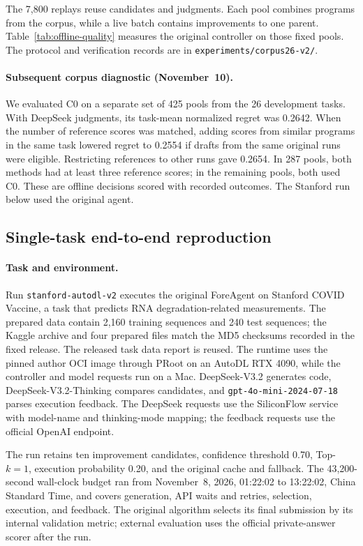 The 7,800 replays reuse candidates and judgments. Each pool combines programs from the corpus, while a live batch contains improvements to one parent. Table~\ref{tab:offline-quality} measures the original controller on those fixed pools. The protocol and verification records are in \texttt{experiments/corpus26-v2/}.

\paragraph{Subsequent corpus diagnostic (November~10).}
We evaluated C0 on a separate set of 425 pools from the 26 development tasks. With DeepSeek judgments, its task-mean normalized regret was 0.2642. When the number of reference scores was matched, adding scores from similar programs in the same task lowered regret to 0.2554 if drafts from the same original runs were eligible. Restricting references to other runs gave 0.2654. In 287 pools, both methods had at least three reference scores; in the remaining pools, both used C0. These are offline decisions scored with recorded outcomes. The Stanford run below used the original agent.

\subsection{Single-task end-to-end reproduction}
\label{sec:online-run}

\paragraph{Task and environment.}
Run \texttt{stanford-autodl-v2} executes the original ForeAgent on Stanford COVID Vaccine, a task that predicts RNA degradation-related measurements. The prepared data contain 2,160 training sequences and 240 test sequences; the Kaggle archive and four prepared files match the MD5 checksums recorded in the fixed release. The released task data report is reused. The runtime uses the pinned author OCI image through PRoot on an AutoDL RTX 4090, while the controller and model requests run on a Mac. DeepSeek-V3.2 generates code, DeepSeek-V3.2-Thinking compares candidates, and \texttt{gpt-4o-mini-2024-07-18} parses execution feedback. The DeepSeek requests use the SiliconFlow service with model-name and thinking-mode mapping; the feedback requests use the official OpenAI endpoint.

The run retains ten improvement candidates, confidence threshold 0.70, Top-$k=1$, execution probability 0.20, and the original cache and fallback. The 43,200-second wall-clock budget ran from November~8, 2026, 01:22:02 to 13:22:02, China Standard Time, and covers generation, API waits and retries, selection, execution, and feedback. The original algorithm selects its final submission by its internal validation metric; external evaluation uses the official private-answer scorer after the run.

